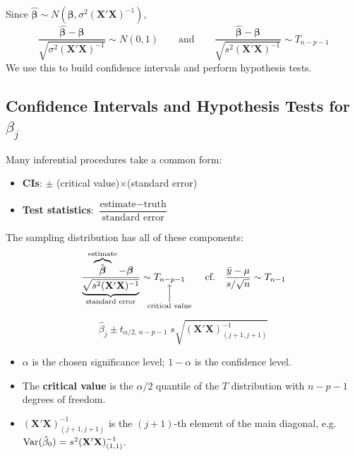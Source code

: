 \begin{theorem}
    Since $\hat{\boldsymbol\beta}\sim N(\boldsymbol\beta,\sigma^2(\mathbf{X}'\mathbf{X})^{-1})$,
    \[\frac{\hat{\boldsymbol\beta}-\boldsymbol\beta}{\sqrt{\sigma^2(\mathbf{X}'\mathbf{X})^{-1}}}\sim N(0,1)
    \qquad\text{and}\qquad
    \boxed{\frac{\hat{\boldsymbol\beta}-\boldsymbol\beta}{\sqrt{s^2(\mathbf{X}'\mathbf{X})^{-1}}}\sim T_{n-p-1}}\]
    We use this to build confidence intervals and perform hypothesis tests.
\end{theorem}

\subsection{Confidence Intervals and Hypothesis Tests for $\beta_j$}

\begin{remark}
    Many inferential procedures take a common form:
    \begin{itemize}
        \item \textbf{CIs}:  $\pm$ (critical value)$\times$(standard error)
        \item \textbf{Test statistics}: $\dfrac{\text{estimate}-\text{truth}}{\text{standard error}}$
    \end{itemize}
    The sampling distribution has all of these components:
    \[\frac{\overbrace{\hat{\boldsymbol\beta}}^{\text{estimate}}-\boldsymbol\beta}
    {\underbrace{\sqrt{s^2(\mathbf{X}'\mathbf{X})^{-1}}}_{\text{standard error}}}
    \sim\underset{\mathclap{\substack{\Big\uparrow\\\text{critical value}}}}{T_{n-p-1}}
    \qquad\text{cf.}\quad\frac{\bar y-\mu}{s/\sqrt n}\sim T_{n-1}\]
\end{remark}

\begin{definition}
    \[\boxed{\hat\beta_j\pm t_{\alpha/2,\,n-p-1}\;s\sqrt{(\mathbf{X}'\mathbf{X})^{-1}_{(j+1,j+1)}}}\]
    \begin{itemize}
        \item $\alpha$ is the chosen significance level; $1-\alpha$ is the confidence level.
        \item The \textbf{critical value} is the $\alpha/2$ quantile of the $T$ distribution
        with $n-p-1$ degrees of freedom.
        \item $(\mathbf{X}'\mathbf{X})^{-1}_{(j+1,j+1)}$ is the $(j+1)$-th element of the main
        diagonal, e.g.\ $\operatorname{Var}(\hat\beta_0)=s^2(\mathbf{X}'\mathbf{X})^{-1}_{(1,1)}$.
    \end{itemize}
\end{definition}

